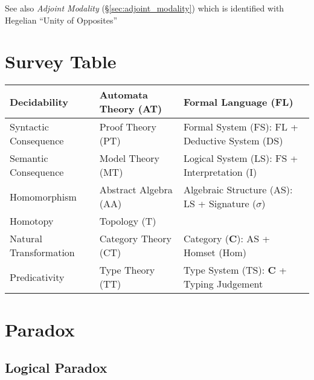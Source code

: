 \fist See also \emph{Adjoint Modality} (\S\ref{sec:adjoint_modality})
which is identified with Hegelian ``Unity of Opposites''



\section{Survey Table}

\begin{tabularx}{\textwidth}{| X | X | X |}
    \hline
    Decidability            & Automata Theory (AT)  & Formal Language (FL) \\
    \hline
    Syntactic Consequence   & Proof Theory (PT)     & Formal System (FS): FL + Deductive System (DS) \\
    \hline
    Semantic Consequence    & Model Theory (MT)     & Logical System (LS): FS + Interpretation (I) \\
    \hline
    Homomorphism            & Abstract Algebra (AA) & Algebraic Structure (AS): LS + Signature ($\sigma$) \\
    \hline
    Homotopy                & Topology (T)          & \\
    \hline
    Natural Transformation  & Category Theory (CT)  & Category ($\mathbf{C}$): AS + Homset (Hom) \\
    \hline
    Predicativity           & Type Theory (TT)      & Type System (TS): $\mathbf{C}$ + Typing Judgement\\
    \hline
\end{tabularx}



\section{Paradox}\label{sec:paradox}

\subsection{Logical Paradox}\label{sec:logical_paradox}
\cite{curry77}

